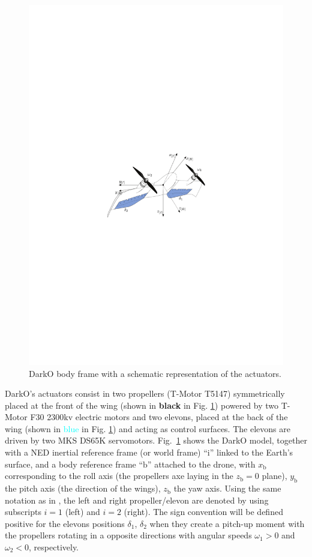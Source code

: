 \begin{figure}[ht]
\centering
    \includegraphics[width=1\columnwidth]{figures/darko.pdf}
    \caption{DarkO body frame with a schematic representation of the actuators.}
    \label{fig:darko2}
\end{figure}
DarkO's actuators consist in two propellers (T-Motor T5147) symmetrically placed at the front of the wing (shown in \textbf{black} in Fig. \ref{fig:darko2}) powered by two T-Motor F30 2300kv electric motors and two elevons, placed at the back of the wing (shown in \textcolor{cyan}{blue} in Fig. \ref{fig:darko2}) and acting as control surfaces. The elevons are driven by two MKS DS65K servomotors. Fig.~\ref{fig:darko2} shows the DarkO model, together with a NED inertial reference frame (or world frame) ``$\text{i}$'' linked to the Earth's surface,
and a body reference frame ``$\text{b}$'' attached to the drone, with $x_{\text{b}}$ corresponding to the roll axis (the propellers axe laying in the $z_{\text{b}} =0$ plane), $y_{\text{b}}$ the pitch axis (the direction of the wings), $z_{\text{b}}$ the yaw axis. Using the same notation as in \cite{lustosa:hal-03035938}, the left and right propeller/elevon are denoted by using subscripts $i=1$ (left) and $i=2$ (right). The sign convention will be defined positive for the elevons positions $\delta_{1}$, $\delta_{2}$ when they create a pitch-up moment with the propellers rotating in a opposite directions with angular speeds $\omega_{1} > 0 $ and $\omega_{2} < 0$, respectively.
